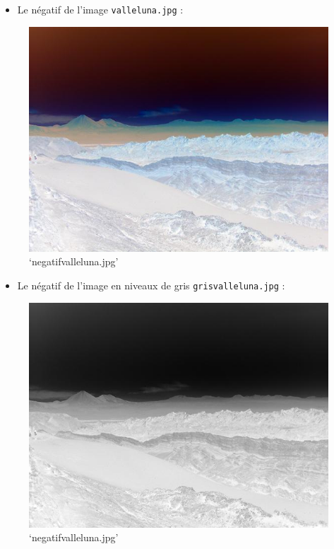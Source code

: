 \documentclass[11pt]{article}
\makeatletter
\def\maxwidth{\ifdim\Gin@nat@width>\linewidth\linewidth
    \else\Gin@nat@width\fi}
\let\Oldincludegraphics\includegraphics
\renewcommand{\includegraphics}[1]{\Oldincludegraphics[width=.8\maxwidth]{#1}}
\providecommand{\tightlist}{%
      \setlength{\itemsep}{0pt}\setlength{\parskip}{0pt}}
\makeatother
\begin{document}
    \begin{itemize}
\tightlist
\item
  Le négatif de l'image \texttt{valleluna.jpg} :
\end{itemize}

\begin{figure}
\centering
\includegraphics{negatifvalleluna.jpg}
\caption{`negatifvalleluna.jpg'}
\end{figure}

\begin{itemize}
\tightlist
\item
  Le négatif de l'image en niveaux de gris \texttt{grisvalleluna.jpg} :
\end{itemize}

\begin{figure}
\centering
\includegraphics{negatifgrisvalleluna.jpg}
\caption{`negatifvalleluna.jpg'}
\end{figure}
\end{document}
